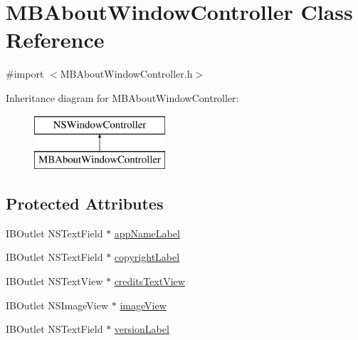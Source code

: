 \hypertarget{interface_m_b_about_window_controller}{\section{M\-B\-About\-Window\-Controller Class Reference}
\label{interface_m_b_about_window_controller}
}


{\ttfamily \#import $<$M\-B\-About\-Window\-Controller.\-h$>$}

Inheritance diagram for M\-B\-About\-Window\-Controller\-:\begin{figure}[H]
\begin{center}
\leavevmode
\includegraphics[height=2.000000cm]{interface_m_b_about_window_controller}
\end{center}
\end{figure}
\subsection*{Protected Attributes}
\begin{DoxyCompactItemize}
\item 
I\-B\-Outlet N\-S\-Text\-Field $\ast$ \hyperlink{interface_m_b_about_window_controller_a68d1566f01a687c06d9d775e75718f82}{app\-Name\-Label}
\item 
I\-B\-Outlet N\-S\-Text\-Field $\ast$ \hyperlink{interface_m_b_about_window_controller_a1f7f91993cecc86c5c347c00a7bea174}{copyright\-Label}
\item 
I\-B\-Outlet N\-S\-Text\-View $\ast$ \hyperlink{interface_m_b_about_window_controller_af45765ba744f421a403d400fcdb3ca0d}{credits\-Text\-View}
\item 
I\-B\-Outlet N\-S\-Image\-View $\ast$ \hyperlink{interface_m_b_about_window_controller_aca28a69f7a1f666d86201d45ccc6c14e}{image\-View}
\item 
I\-B\-Outlet N\-S\-Text\-Field $\ast$ \hyperlink{interface_m_b_about_window_controller_a3a54f9ecab2548f2f6647ffd8af3b1f9}{version\-Label}
\end{DoxyCompactItemize}


